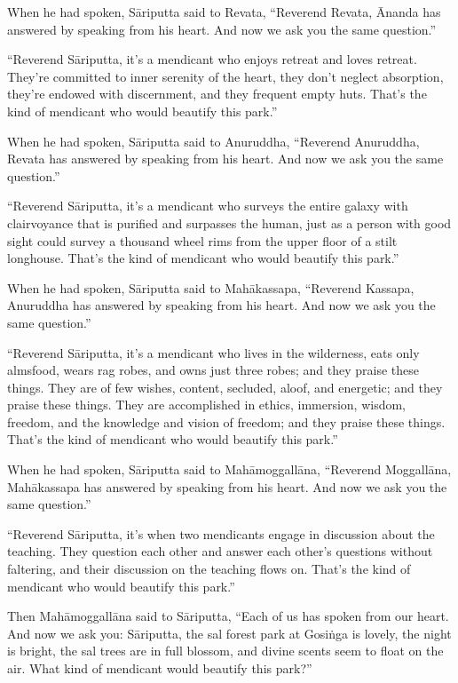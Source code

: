 \documentclass[12pt,openany]{book}%
\begin{document}
When he had spoken, \textsanskrit{Sāriputta} said to Revata, “Reverend Revata, Ānanda has answered by speaking from his heart. And now we ask you the same question.” 

“Reverend \textsanskrit{Sāriputta}, it’s a mendicant who enjoys retreat and loves retreat. They’re committed to inner serenity of the heart, they don’t neglect absorption, they’re endowed with discernment, and they frequent empty huts. That’s the kind of mendicant who would beautify this park.” 

When he had spoken, \textsanskrit{Sāriputta} said to Anuruddha, “Reverend Anuruddha, Revata has answered by speaking from his heart. And now we ask you the same question.” 

“Reverend \textsanskrit{Sāriputta}, it’s a mendicant who surveys the entire galaxy with clairvoyance that is purified and surpasses the human, just as a person with good sight could survey a thousand wheel rims from the upper floor of a stilt longhouse. That’s the kind of mendicant who would beautify this park.” 

When he had spoken, \textsanskrit{Sāriputta} said to \textsanskrit{Mahākassapa}, “Reverend Kassapa, Anuruddha has answered by speaking from his heart. And now we ask you the same question.” 

“Reverend \textsanskrit{Sāriputta}, it’s a mendicant who lives in the wilderness, eats only almsfood, wears rag robes, and owns just three robes; and they praise these things. They are of few wishes, content, secluded, aloof, and energetic; and they praise these things. They are accomplished in ethics, immersion, wisdom, freedom, and the knowledge and vision of freedom; and they praise these things. That’s the kind of mendicant who would beautify this park.” 

When he had spoken, \textsanskrit{Sāriputta} said to \textsanskrit{Mahāmoggallāna}, “Reverend \textsanskrit{Moggallāna}, \textsanskrit{Mahākassapa} has answered by speaking from his heart. And now we ask you the same question.” 

“Reverend \textsanskrit{Sāriputta}, it’s when two mendicants engage in discussion about the teaching. They question each other and answer each other’s questions without faltering, and their discussion on the teaching flows on. That’s the kind of mendicant who would beautify this park.” 

Then \textsanskrit{Mahāmoggallāna} said to \textsanskrit{Sāriputta}, “Each of us has spoken from our heart. And now we ask you: \textsanskrit{Sāriputta}, the sal forest park at \textsanskrit{Gosiṅga} is lovely, the night is bright, the sal trees are in full blossom, and divine scents seem to float on the air. What kind of mendicant would beautify this park?” 
\end{document}
